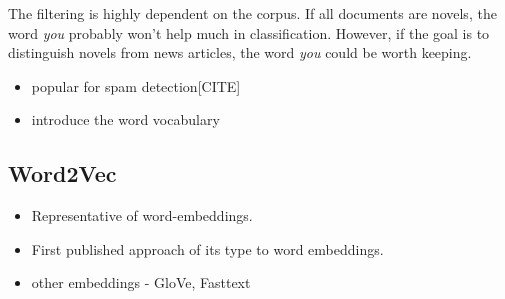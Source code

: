The filtering is highly dependent on the corpus. If all documents are novels, the word \textit{you} probably won't help much in classification. However, if the goal is to distinguish novels from news articles, the word \textit{you} could be worth keeping.

\begin{itemize}
    \item popular for spam detection[CITE]
    \item introduce the word vocabulary
\end{itemize}

\subsection{Word2Vec}
\begin{itemize}
    \item Representative of word-embeddings.
    \item First published approach of its type to word embeddings.
    \item other embeddings - GloVe\cite{glove}, Fasttext\cite{fasttext}
\end{itemize}

